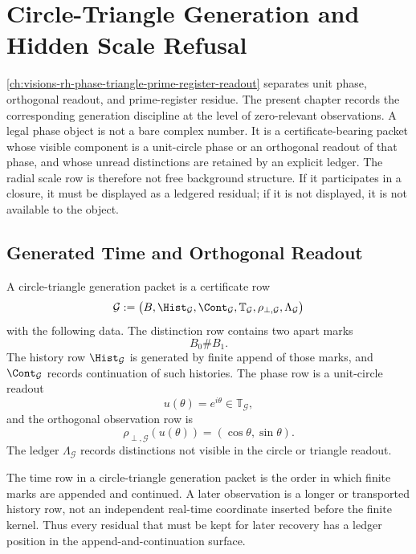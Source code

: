 \chapter{Circle-Triangle Generation and Hidden Scale Refusal}
\label{ch:visions-rh-circle-triangle-hidden-scale-generation}

\autoref{ch:visions-rh-phase-triangle-prime-register-readout} separates
unit phase, orthogonal readout, and prime-register residue. The present
chapter records the corresponding generation discipline at the level of
zero-relevant observations. A legal phase object is not a bare complex
number. It is a certificate-bearing packet whose visible component is a
unit-circle phase or an orthogonal readout of that phase, and whose
unread distinctions are retained by an explicit ledger. The radial scale
row is therefore not free background structure. If it participates in a
closure, it must be displayed as a ledgered residual; if it is not
displayed, it is not available to the object.

\section{Generated Time and Orthogonal Readout}
\label{sec:rh-circle-triangle-generated-time}

\begin{definition}
\label{def:rh-circle-triangle-generation-packet}
A circle-triangle generation packet is a certificate row
$$
\mathcal G
:=
\bigl(
B,\Hist_{\mathcal G},
\Cont_{\mathcal G},
\mathbb T_{\mathcal G},
\rho_{\perp,\mathcal G},
\Lambda_{\mathcal G}
\bigr)
$$
with the following data. The distinction row contains two apart marks
$$
B_0\#B_1.
$$
The history row $\Hist_{\mathcal G}$ is generated by finite append of
those marks, and $\Cont_{\mathcal G}$ records continuation of such
histories. The phase row is a unit-circle readout
$$
u(\theta)=e^{i\theta}\in\mathbb T_{\mathcal G},
$$
and the orthogonal observation row is
$$
\rho_{\perp,\mathcal G}(u(\theta))
=
(\cos\theta,\sin\theta).
$$
The ledger $\Lambda_{\mathcal G}$ records distinctions not visible in the
circle or triangle readout.
\end{definition}

\begin{principle}
\label{prin:rh-circle-triangle-observation-time-append-order}
The time row in a circle-triangle generation packet is the order in which
finite marks are appended and continued. A later observation is a longer
or transported history row, not an independent real-time coordinate
inserted before the finite kernel. Thus every residual that must be kept
for later recovery has a ledger position in the append-and-continuation
surface.
\end{principle}

